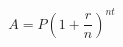 \documentclass[12pt]{article}
\begin{document}
\begin{equation*}
  A = P \left(1 + \frac{r}{n}\right)^{nt}
\end{equation*}
\end{document}
